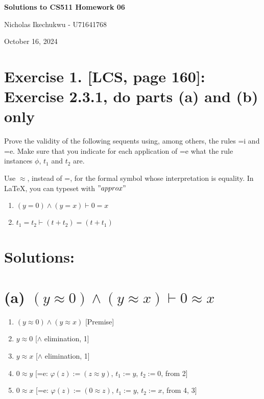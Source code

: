 \documentclass{article}
\newenvironment{proof}
{\begin{mdframed}[linewidth=0.5pt]\begin{enumerate}[label=\arabic*.,leftmargin=*]}
{\end{enumerate}\end{mdframed}}
\begin{document}
\begin{center}
    \Large\textbf{Solutions to CS511 Homework 06}
    
    \vspace{0.5cm}
    
    \large Nicholas Ikechukwu - U71641768
    
    \vspace{0.3cm}
    
    \large October 16, 2024
\end{center}



\section*{Exercise 1. [LCS, page 160]: Exercise 2.3.1, do parts (a) and (b) only }
\begin{mdframed}
    Prove the validity of the following sequents using, among others, the rules =i
    and =e. Make sure that you indicate for each application of =e what the rule
    instances $\phi$, $t_1$ and $t_2$ are.
    
    Use $\approx$, instead of =, for the formal symbol whose interpretation is equality. In LaTeX, you can typeset
    with ${"approx"}$
     
    
    \begin{enumerate}[label=(\alph*)]
    \item $(y = 0) \land (y = x) \vdash 0 = x$
    \item $t_1 = t_2 \vdash (t + t_2) = (t + t_1)$
    \end{enumerate}
\end{mdframed}

\section*{Solutions:}

\section*{(a) $(y \approx 0) \wedge (y \approx x) \vdash 0 \approx x$}

\begin{proof}
\begin{enumerate}
    \item $(y \approx 0) \wedge (y \approx x)$ \hfill [Premise]
    \item $y \approx 0$ \hfill [$\wedge$ elimination, 1]
    \item $y \approx x$ \hfill [$\wedge$ elimination, 1]
    \item $0 \approx y$ \hfill [=e: $\varphi(z) := (z \approx y)$, $t_1 := y$, $t_2 := 0$, from 2]
    \item $0 \approx x$ \hfill [=e: $\varphi(z) := (0 \approx z)$, $t_1 := y$, $t_2 := x$, from 4, 3]
\end{enumerate}
\end{proof}
\end{document}
